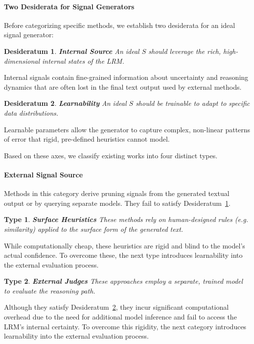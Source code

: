\documentclass[11pt]{article}
\theoremstyle{plain}
\newtheorem{type}{Type}
\newtheorem{desideratum}{Desideratum}
\begin{document}
\paragraph{Two Desiderata for Signal Generators}
Before categorizing specific methods, we establish two desiderata for an ideal signal generator:

\begin{desideratum}\label{desideratum:internal}
\textbf{Internal Source} An ideal $S$ should leverage the rich, high-dimensional internal states of the LRM.
\end{desideratum}
Internal signals contain fine-grained information about uncertainty and reasoning dynamics that are often lost in the final text output used by external methods.

\begin{desideratum}\label{desideratum:learnable}
\textbf{Learnability} An ideal $S$ should be trainable to adapt to specific data distributions.
\end{desideratum}
Learnable parameters allow the generator to capture complex, non-linear patterns of error that rigid, pre-defined heuristics cannot model.

Based on these axes, we classify existing works into four distinct types.

\paragraph{External Signal Source}
Methods in this category derive pruning signals from the generated textual output or by querying separate models. They fail to satisfy Desideratum~\ref{desideratum:internal}.

\begin{type}\label{type:heuristic} \textbf{Surface Heuristics}
These methods rely on human-designed rules (e.g. similarity) applied to the surface form of the generated text.
\end{type}
While computationally cheap, these heuristics are rigid and blind to the model's actual confidence.
To overcome these, the next type introduces learnability into the external evaluation process.

\begin{type}\label{type:aux} \textbf{External Judges}
These approaches employ a separate, trained model to evaluate the reasoning path.
\end{type}
Although they satisfy Desideratum~\ref{desideratum:learnable}, they incur significant computational overhead due to the need for additional model inference and fail to access the LRM's internal certainty.
To overcome this rigidity, the next category introduces learnability into the external evaluation process.
\end{document}
